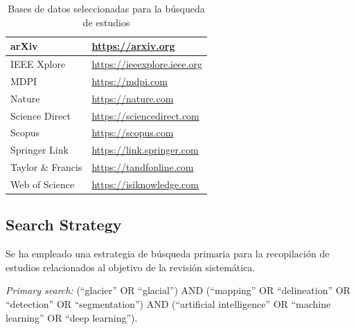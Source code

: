 \documentclass{article}
\begin{document}
\begin{table}[H]
    \centering
    \caption{Bases de datos seleccionadas para la búsqueda de estudios}
    \hspace{1cm}
    \label{tab:selected_repositories}
    \begin{tabularx}{\textwidth}{XX}
        \hline
        arXiv             & \url{https://arxiv.org}           \\ \hline
        IEEE Xplore       & \url{https://ieeexplore.ieee.org} \\ \hline
        MDPI              & \url{https://mdpi.com}            \\ \hline
        Nature            & \url{https://nature.com}          \\ \hline
        Science Direct    & \url{https://sciencedirect.com}   \\ \hline
        Scopus            & \url{https://scopus.com}          \\ \hline
        Springer Link     & \url{https://link.springer.com}   \\ \hline
        Taylor \& Francis & \url{https://tandfonline.com}     \\ \hline
        Web of Science    & \url{https://isiknowledge.com}    \\ \hline
    \end{tabularx}
\end{table}

\subsection{Search Strategy}

Se ha empleado una estrategia de búsqueda primaria para la recopilación de estudios relacionados al objetivo de la revisión sistemática.

\textit{Primary search:} (“glacier” OR “glacial”) AND (“mapping” OR “delineation” OR “detection” OR “segmentation”) AND (“artificial intelligence” OR “machine learning” OR “deep learning”).
\end{document}

